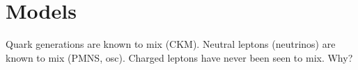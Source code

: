 
\cite{PhysRevLett.126.141801} %

\cite{Aaij2022}%




\section{Models}
Quark generations are known to mix (CKM).
Neutral leptons (neutrinos) are known to mix (PMNS, osc).
Charged leptons have never been seen to mix. Why?

